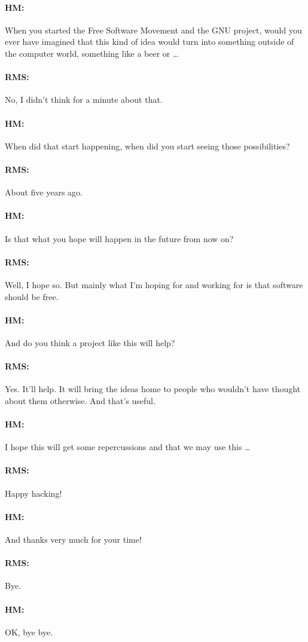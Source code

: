 \paragraph{HM:}{When you started the Free Software Movement and the GNU project,
would you ever have imagined that this kind of idea would turn into something
outside of the computer world, something like a beer or \dots}

\paragraph{RMS:}{No, I didn't think for a minute about that.}

\paragraph{HM:}{When did that start happening, when did you start seeing those
possibilities?}

\paragraph{RMS:}{About f\hbox{}ive years ago.}

\paragraph{HM:}{Is that what you hope will happen in the future from now on?}

\paragraph{RMS:}{Well, I hope so. But mainly what I'm hoping for and working for
is that software should be free.}

\paragraph{HM:}{And do you think a project like this will help?}

\paragraph{RMS:}{Yes. It'll help. It will bring the ideas home to people who
wouldn't have thought about them otherwise. And that's useful.}

\paragraph{HM:}{I hope this will get some repercussions and that we may use this
\dots}

\paragraph{RMS:}{Happy hacking!}

\paragraph{HM:}{And thanks very much for your time!}

\paragraph{RMS:}{Bye.}

\paragraph{HM:}{OK, bye bye.}
